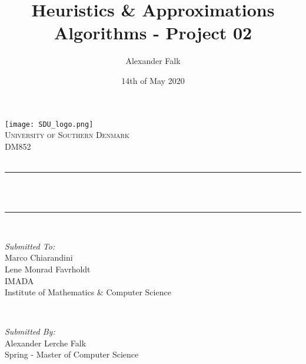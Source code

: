 \documentclass[12pt]{article}
\title{Heuristics \& Approximations Algorithms - Project 02}								%
\author{Alexander Falk}								%
\date{14th of May 2020}											%
\makeatletter
\let\thetitle\@title
\let\thedate\@date
\makeatother
\begin{document}

\begin{titlepage}
	\centering
    \vspace*{0.5 cm}
    \texttt{[image: SDU\_logo.png]}\\[1.0 cm]	%
    \textsc{\LARGE University of Southern Denmark}\\[2.0 cm]	%
	\textsc{\Large DM852}\\[0.5 cm]				%
	\textsc{\Large \thedate}\\[0.5 cm]				%
	\rule{\linewidth}{0.2 mm} \\[0.4 cm]
	{ \huge \bfseries \thetitle}\\
	\rule{\linewidth}{0.2 mm} \\[1.5 cm]
	
	\begin{minipage}{0.4\textwidth}
		\begin{flushleft} \large
			\emph{Submitted To:}\\
			Marco Chiarandini\\
            Lene Monrad Favrholdt \\
			IMADA \\
			Institute of Mathematics \& Computer Science\\
			\end{flushleft}
			\end{minipage}~
			\begin{minipage}{0.4\textwidth}
            
			\begin{flushright} \large
			\emph{Submitted By:} \\
			Alexander Lerche Falk\\
            Spring - Master of Computer Science\\
		\end{flushright}
        
	\end{minipage}\\[2 cm]
    
	
\end{titlepage}


\tableofcontents
\pagebreak

\end{document}
